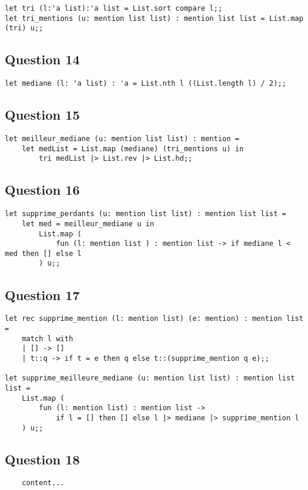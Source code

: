 \documentclass[french, 10pt, a4paper]{article}
\begin{document}
\begin{verbatim}
let tri (l:'a list):'a list = List.sort compare l;;
let tri_mentions (u: mention list list) : mention list list = List.map (tri) u;;
\end{verbatim}



\subsection{Question 14}

\begin{verbatim}
let mediane (l: 'a list) : 'a = List.nth l ((List.length l) / 2);;
\end{verbatim}



\subsection{Question 15}

\begin{verbatim}
let meilleur_mediane (u: mention list list) : mention =
	let medList = List.map (mediane) (tri_mentions u) in
		tri medList |> List.rev |> List.hd;;
\end{verbatim}



\subsection{Question 16}

\begin{verbatim}
let supprime_perdants (u: mention list list) : mention list list =
	let med = meilleur_mediane u in
		List.map (
			fun (l: mention list ) : mention list -> if mediane l < med then [] else l
		) u;;
\end{verbatim}



\subsection{Question 17}

\begin{verbatim}
let rec supprime_mention (l: mention list) (e: mention) : mention list =
	match l with
	| [] -> []
	| t::q -> if t = e then q else t::(supprime_mention q e);;

let supprime_meilleure_mediane (u: mention list list) : mention list list =
	List.map (
		fun (l: mention list) : mention list ->
			if l = [] then [] else l |> mediane |> supprime_mention l
	) u;;
\end{verbatim}



\subsection{Question 18}

\begin{verbatim}
	content...
\end{verbatim}
\end{document}

